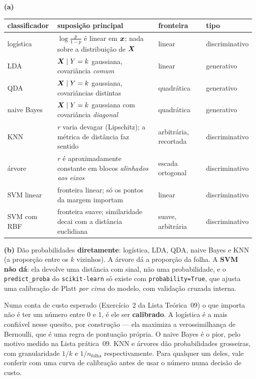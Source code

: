 \documentclass[11pt,a4paper]{article}
\begin{document}
\begin{solucao}
\textbf{(a)}
\begin{center}\footnotesize
\renewcommand{\arraystretch}{1.35}
\begin{tabular}{@{}lp{5.2cm}ll@{}}
\toprule
classificador & suposição principal & fronteira & tipo \\
\midrule
logística  & $\log\frac{p}{1-p}$ é linear em $\bm{x}$; nada sobre a distribuição de $\bm{X}$ & linear & discriminativo \\
LDA        & $\bm{X}\mid Y=k$ gaussiana, covariância \emph{comum} & linear & generativo \\
QDA        & $\bm{X}\mid Y=k$ gaussiana, covariâncias distintas & quadrática & generativo \\
naive Bayes & $\bm{X}\mid Y=k$ gaussiana com covariância \emph{diagonal} & quadrática & generativo \\
KNN        & $r$ varia devagar (Lipschitz); a métrica de distância faz sentido & arbitrária, recortada & discriminativo \\
árvore     & $r$ é aproximadamente constante em blocos \emph{alinhados aos eixos} & escada ortogonal & discriminativo \\
SVM linear & fronteira linear; só os pontos da margem importam & linear & discriminativo \\
SVM com RBF & fronteira suave; similaridade decai com a distância euclidiana & suave, arbitrária & discriminativo \\
\bottomrule
\end{tabular}
\end{center}

\smallskip
\textbf{(b)} Dão probabilidades \textbf{diretamente}: logística, LDA, QDA, naive
Bayes e KNN (a proporção entre os $k$ vizinhos). A árvore dá a proporção da folha.
A \textbf{SVM não dá}: ela devolve uma distância com sinal, não uma
probabilidade, e o \texttt{predict\_proba} do \texttt{scikit-learn} só existe com
\texttt{probability=True}, que ajusta uma calibração de Platt \emph{por cima} do
modelo, com validação cruzada interna.

Numa conta de custo esperado (Exercício~2 da Lista Teórica~09) o que importa não
é ter um número entre 0 e 1, é ele ser \textbf{calibrado}. A logística é a mais
confiável nesse quesito, por construção --- ela maximiza a verossimilhança de
Bernoulli, que é uma regra de pontuação própria. O naive Bayes é o pior, pelo
motivo medido na Lista prática~09. KNN e árvores dão probabilidades grosseiras,
com granularidade $1/k$ e $1/n_{\text{folha}}$ respectivamente. Para qualquer um
deles, vale conferir com uma curva de calibração antes de usar o número numa
decisão de custo.


\end{solucao}
\end{document}
